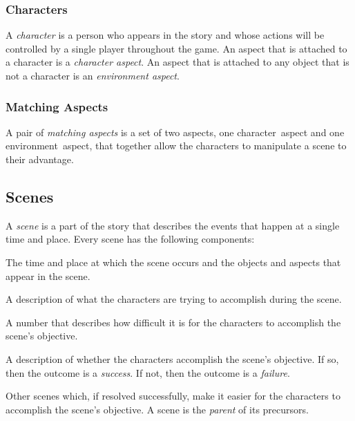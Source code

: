 \documentclass[12pt, a5paper, parskip=half-]{scrartcl}
\begin{document}
\subsubsection*{Characters}
A \emph{character} is a person who appears in the story and whose actions will be controlled by a single player throughout the game. 
An aspect that is attached to a character is a \emph{character aspect}.
An aspect that is attached to any object that is not a character is an \emph{environment aspect}.

\subsubsection*{Matching Aspects}
A pair of \emph{matching aspects} is a set of two aspects, one character~aspect and one environment~aspect, that together allow the characters to manipulate a scene to their advantage.

\newpage

\subsection*{Scenes}
A \emph{scene} is a part of the story that describes the events that happen at a single time and place.
Every scene has the following components:
\begin{description}[labelindent=0.25cm, leftmargin=\widthof{\hspace{0.25cm}\textbullet\space}, font=\normalfont\textbullet\bfseries\space]%
  \item[Setting]
  The time and place at which the scene occurs and the objects and aspects that appear in the scene.
  \item[Objective]
    A description of what the characters are trying to accomplish during the scene.
  \item[Difficulty Rating]
    A number that describes how difficult it is for the characters to accomplish the scene's objective.
  \item[Outcome]
    A description of whether the characters accomplish the scene's objective. If so, then the outcome is a \emph{success}.  If not, then the outcome is a \emph{failure}.
  \item[Precursors]
    Other scenes which, if resolved successfully, make it easier for the characters to accomplish the scene's objective.
    A scene is the \emph{parent} of its precursors.
\end{description} 

\bigskip
\end{document}
